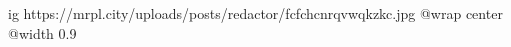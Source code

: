  
 
 
 
 

\ifcmt
  ig https://mrpl.city/uploads/posts/redactor/fcfchcnrqvwqkzkc.jpg
  @wrap center
  @width 0.9
\fi
